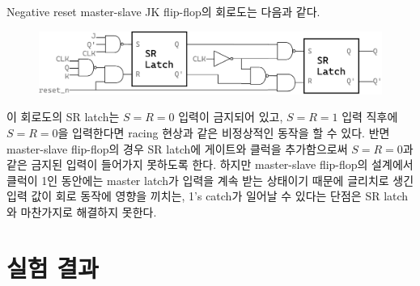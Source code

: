 \documentclass{scrartcl}
\begin{document}
Negative reset master-slave JK flip-flop의 회로도는 다음과 같다.
\begin{figure}[H]
  \centering
  \includegraphics[width=0.9\linewidth]{jkff_schematic.pdf}
\end{figure}

이 회로도의 SR latch는 \(S = R = 0\) 입력이 금지되어 있고, \(S = R = 1\) 입력 직후에 \(S = R = 0\)을 입력한다면 racing 현상과 같은 비정상적인 동작을 할 수 있다.
반면 master-slave flip-flop의 경우 SR latch에 게이트와 클럭을 추가함으로써 \(S = R = 0\)과 같은 금지된 입력이 들어가지 못하도록 한다.
하지만 master-slave flip-flop의 설계에서 클럭이 1인 동안에는 master latch가 입력을 계속 받는 상태이기 때문에 글리치로 생긴 입력 값이 회로 동작에 영향을 끼치는, 1's catch가 일어날 수 있다는 단점은 SR latch와 마찬가지로 해결하지 못한다.

\section{실험 결과}
\end{document}
